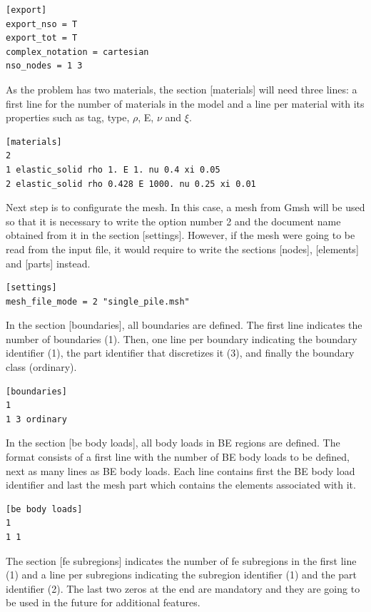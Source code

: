 \documentclass[a4]{article}
\begin{document}
\begin{Verbatim}
[export]
export_nso = T
export_tot = T
complex_notation = cartesian
nso_nodes = 1 3
\end{Verbatim}

As the problem has two materials, the section [materials] will need three lines: a first line for the number of materials in the model and a line per material with its properties such as tag, type, $\rho$, E, $\nu$ and $ \xi $.

\begin{Verbatim}
[materials]
2
1 elastic_solid rho 1. E 1. nu 0.4 xi 0.05
2 elastic_solid rho 0.428 E 1000. nu 0.25 xi 0.01
\end{Verbatim}

Next step is to configurate the mesh. In this case, a mesh from Gmsh will be used so that it is necessary to write the option number 2 and the document name obtained from it in the section [settings]. However, if the mesh were going to be read from the input file, it would require to write the sections [nodes], [elements] and [parts] instead.

\begin{Verbatim}	
[settings]
mesh_file_mode = 2 "single_pile.msh"
\end{Verbatim}

In the section [boundaries], all boundaries are defined. The first line indicates the number of boundaries (1). Then, one line per boundary indicating the boundary identifier (1), the part identifier that discretizes it (3), and finally the boundary class (ordinary).

\begin{Verbatim}
[boundaries]
1
1 3 ordinary
\end{Verbatim}

In the section [be body loads], all body loads in BE regions are defined. The format consists of a first line with the number of BE body loads to be defined, next as many lines as BE body loads. Each line contains first the BE body load identifier and last the mesh part which contains the elements associated with it.

\begin{Verbatim}
[be body loads]
1
1 1
\end{Verbatim}

The section [fe subregions] indicates the number of fe subregions in the first line (1) and a line per subregions indicating the subregion identifier (1) and the part identifier (2). The last two zeros at the end are mandatory and they are going to be used in the future for additional features.
\end{document}
